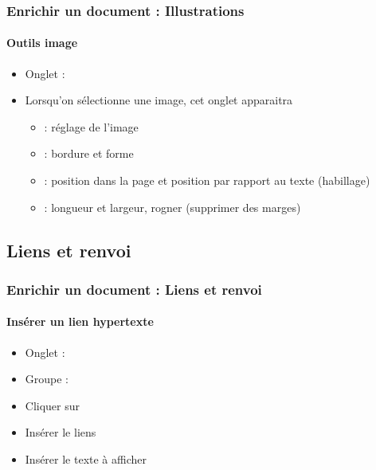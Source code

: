 \documentclass[xcolor=table]{beamer}
\begin{document}
\begin{frame}[t]
\frametitle{Enrichir un document : Illustrations}
\framesubtitle{Outils image}


\begin{minipage}{0.56\textwidth}
\begin{itemize}
	\item Onglet : 
	\item Lorsqu'on sélectionne une image, cet onglet apparaitra
	\begin{itemize}
		\item {} : réglage de l'image
		\item {} : bordure et forme
		\item {} : position dans la page et position par rapport au texte (habillage)
		\item {} : longueur et largeur, rogner (supprimer des marges)
	\end{itemize}
\end{itemize}
\end{minipage}
\begin{minipage}{0.22\textwidth}
\end{minipage}
\begin{minipage}{0.20\textwidth}	
\end{minipage}

\end{frame}

\subsection{Liens et renvoi}

\begin{frame}[t]
\frametitle{Enrichir un document : Liens et renvoi}
\framesubtitle{Insérer un lien hypertexte}

\begin{minipage}{0.38\textwidth}
	\begin{itemize}
		\item Onglet : 
		\item Groupe : 
		\item Cliquer sur 
		\item Insérer le liens
		\item Insérer le texte à afficher
	\end{itemize}
\end{minipage}
\begin{minipage}{0.6\textwidth}	
	\begin{flushright}
	\end{flushright}
	
	\vspace{-12pt}
\end{minipage}

\end{frame}
\end{document}
